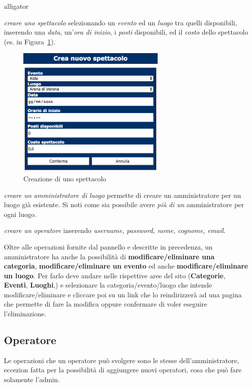 \documentclass[10pt, a4paper]{article}
\begin{document}
\begin{labeling}{alligator}
	\item[\emph{creare uno spettacolo}] selezionando un \emph{evento} ed un \emph{luogo}
	tra quelli disponibili, inserendo una \emph{data}, un'\emph{ora di inizio}, i \emph{posti} disponibili, 
	ed il \emph{costo} dello spettacolo (es. in Figura~\ref{fig:creazione_spettacolo}).
	\begin{figure}[h!]
		\centering
		\includegraphics[width=0.65\textwidth]{Images/creazione_spettacolo.png}
		\caption{Creazione di uno spettacolo}
		\label{fig:creazione_spettacolo}
	\end{figure}
	
	\item[\emph{creare un amministratore di luogo}] permette di creare un amministratore
	per un luogo già esistente. Si noti come sia possibile avere \emph{più di un} amministratore per ogni luogo.
	
	\item[\emph{creare un operatore}] inserendo \emph{username, password, nome, 
	cognome, email}.
\end{labeling}

Oltre alle operazioni fornite dal pannello e descritte in precedenza,
un amministratore ha anche la possibilità di \textbf{modificare/eliminare una categoria},
\textbf{modificare/eliminare un evento} ed anche \textbf{modificare/eliminare un luogo}. Per farlo
deve andare nelle rispettive aree del sito (\textbf{\textcolor{UniPD}{Categorie}},
\textbf{\textcolor{UniPD}{Eventi}}, \textbf{\textcolor{UniPD}{Luoghi}},) e selezionare
la categoria/evento/luogo che intende modificare/eliminare e cliccare poi su un link
che lo reindirizzerà ad una pagina che permette di fare la modifica oppure confermare di voler eseguire l'eliminazione.

\subsection{Operatore}
Le operazioni che un operatore può svolgere sono le stesse dell'amministratore, eccezion fatta
per la possibilità di aggiungere nuovi operatori, cosa che può fare solamente l'admin.
\end{document}
